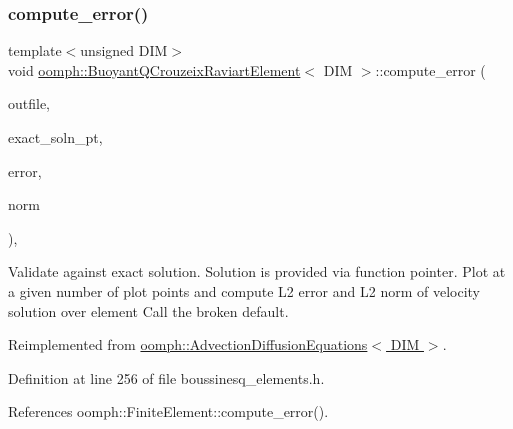 \subsubsection{\texorpdfstring{compute\+\_\+error()}{compute\_error()}\hspace{0.1cm}{\footnotesize\ttfamily [2/2]}}
{\footnotesize\ttfamily template$<$unsigned D\+IM$>$ \\
void \hyperlink{classoomph_1_1BuoyantQCrouzeixRaviartElement}{oomph\+::\+Buoyant\+Q\+Crouzeix\+Raviart\+Element}$<$ D\+IM $>$\+::compute\+\_\+error (\begin{DoxyParamCaption}\item[{std\+::ostream \&}]{outfile,  }\item[{\hyperlink{classoomph_1_1FiniteElement_a690fd33af26cc3e84f39bba6d5a85202}{Finite\+Element\+::\+Steady\+Exact\+Solution\+Fct\+Pt}}]{exact\+\_\+soln\+\_\+pt,  }\item[{double \&}]{error,  }\item[{double \&}]{norm }\end{DoxyParamCaption})\hspace{0.3cm}{\ttfamily [inline]}, {\ttfamily [virtual]}}



Validate against exact solution. Solution is provided via function pointer. Plot at a given number of plot points and compute L2 error and L2 norm of velocity solution over element Call the broken default. 



Reimplemented from \hyperlink{classoomph_1_1AdvectionDiffusionEquations_acb1fcfb29911210ad7c0bc252f0ed665}{oomph\+::\+Advection\+Diffusion\+Equations$<$ D\+I\+M $>$}.



Definition at line 256 of file boussinesq\+\_\+elements.\+h.



References oomph\+::\+Finite\+Element\+::compute\+\_\+error().

\mbox{\label{classoomph_1_1BuoyantQCrouzeixRaviartElement_a37e9dc4e6e5a8120a2f27587b5853086}} 
